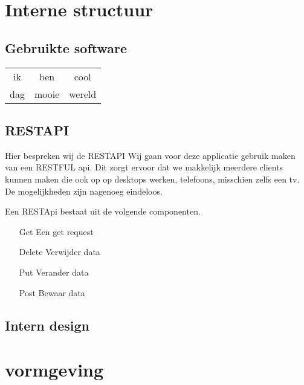 \documentclass[a4paper,11pt]{article}
\begin{document}
\section{Interne structuur}

\subsection{Gebruikte software}

\begin{tabular}{c|c|c}
ik & ben & cool \\
dag & mooie & wereld
\end{tabular}

\subsection{RESTAPI} %
Hier bespreken wij de RESTAPI \cite{restwiki}
Wij gaan voor deze applicatie gebruik maken van een RESTFUL api. Dit zorgt
ervoor dat we makkelijk meerdere clients kunnen maken die ook op op desktops
werken, telefoons, misschien zelfs een tv. De mogelijkheden zijn nagenoeg
eindeloos.

Een RESTApi bestaat uit de volgende componenten.
\begin{itemize}
  \item [Get] Een get request
  \item [Delete] Verwijder data
  \item [Put] Verander data
  \item [Post] Bewaar data
\end{itemize}

\subsection{Intern design}

\section{vormgeving}

\end{document}
